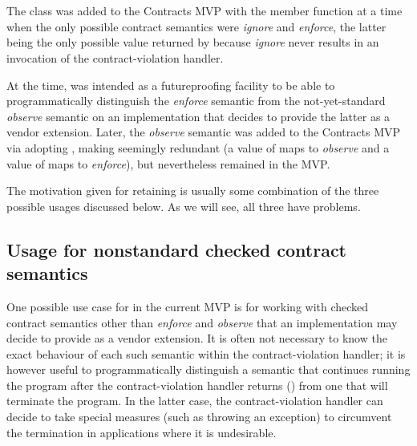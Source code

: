 \section{}

The class \mbox{} was added to the Contracts MVP with the member function  at a time when the only possible contract semantics were \emph{ignore} and \emph{enforce}, the latter being the only possible value returned by  because \emph{ignore} never results in an invocation of the contract-violation handler.

At the time,  was intended as a futureproofing facility to be able to programmatically distinguish the \emph{enforce} semantic from the not-yet-standard \emph{observe} semantic on an implementation that decides to provide the latter as a vendor extension. Later, the \emph{observe} semantic was added to the Contracts MVP via adopting \cite{P2877R0}, making  seemingly redundant (a value of  maps to \emph{observe} and a value of  maps to \emph{enforce}), but nevertheless  remained in the MVP. 

The motivation given for retaining  is usually some combination of the three possible usages discussed below. As we will see, all three have problems.

\subsection{Usage for nonstandard checked contract semantics}

One possible use case for  in the current MVP is for working with checked contract semantics other than \emph{enforce} and \emph{observe} that an implementation may decide to provide as a vendor extension. It is often not necessary to know the exact behaviour of each such semantic within the contract-violation handler; it is however useful to programmatically distinguish a semantic that continues running the program after the contract-violation handler returns () from one that will terminate the program. In the latter case, the contract-violation handler can decide to take special measures (such as throwing an exception) to circumvent the termination in applications where it is undesirable.

